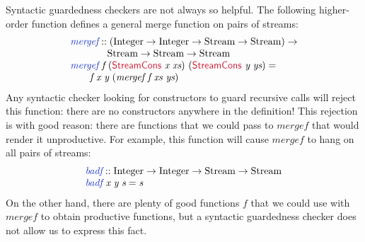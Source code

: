 \documentclass[natbib]{sigplanconf}
\newcommand{\cons}[1]{\textcolor{cons}{\textsf{#1}}}
\newcommand{\tyname}[1]{\textrm{#1}}
\newcommand{\ident}[1]{\textit{#1}}
\newcommand{\defn}[1]{\textcolor{defnd}{\ident{#1}}}
\begin{document}
Syntactic guardedness checkers are not always so helpful. The
following higher-order function defines a general merge function on
pairs of streams:
\begin{displaymath}
  \begin{array}{l}
    \defn{mergef} :: (\tyname{Integer} \to \tyname{Integer} \to \tyname{Stream} \to \tyname{Stream}) \to \\
    \textcolor{white}{\textrm{mergef} :: }\tyname{Stream} \to \tyname{Stream} \to \tyname{Stream} \\
    \defn{mergef}\ \ident{f}\ (\cons{StreamCons}\ \ident{x}\ \ident{xs})\ (\cons{StreamCons}\ \ident{y}\ \ident{ys}) = \\
    \quad\quad \ident{f}\ \ident{x}\ \ident{y}\ (\ident{mergef}\ \ident{f}\ \ident{xs}\ \ident{ys})
  \end{array}
\end{displaymath}
Any syntactic checker looking for constructors to guard recursive
calls will reject this function: there are no constructors anywhere in
the definition! This rejection is with good reason: there are
functions that we could pass to $\ident{mergef}$ that would render it
unproductive. For example, this function will cause $\ident{mergef}$
to hang on all pairs of streams:
\begin{displaymath}
  \begin{array}{l}
    \defn{badf} :: \tyname{Integer} \to \tyname{Integer} \to \tyname{Stream} \to \tyname{Stream} \\
    \defn{badf}\ \ident{x}\ \ident{y}\ \ident{s} = \ident{s}
  \end{array}
\end{displaymath}
On the other hand, there are plenty of good functions $\ident{f}$ that
we could use with $\ident{mergef}$ to obtain productive functions, but
a syntactic guardedness checker does not allow us to express this
fact.
\end{document}
